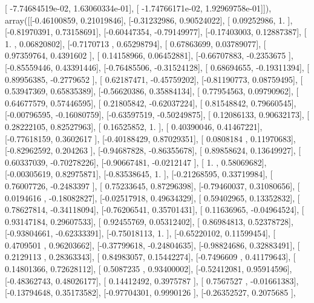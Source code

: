 \documentclass{article}
\begin{document}
       [ -7.74684519e-02,   1.63060334e-01],
       [ -1.74766171e-02,   1.92969758e-01]]), array([[-0.46100859,  0.21019846],
       [-0.31232986,  0.90524022],
       [ 0.09252986,  1.        ],
       [-0.81970391,  0.73158691],
       [-0.60447354, -0.79149977],
       [-0.17403003,  0.12887387],
       [ 1.        ,  0.06820802],
       [-0.7170713 ,  0.65298794],
       [ 0.67863699,  0.03789077],
       [ 0.97359764,  0.4391602 ],
       [ 0.14158966,  0.06452881],
       [-0.66707883, -0.2353675 ],
       [-0.85559446,  0.43391446],
       [-0.76485506, -0.31524128],
       [ 0.68694655, -0.19311394],
       [ 0.89956385, -0.2779652 ],
       [ 0.62187471, -0.45759202],
       [-0.81190773,  0.08759495],
       [ 0.53947369,  0.65835389],
       [-0.56620386,  0.35884134],
       [ 0.77954563,  0.09790962],
       [ 0.64677579,  0.57446595],
       [ 0.21805842, -0.62037224],
       [ 0.81548842,  0.79660545],
       [-0.00796595, -0.16080759],
       [-0.63597519, -0.50249875],
       [ 0.12086133,  0.90632173],
       [ 0.28222105,  0.82527963],
       [ 0.16525852,  1.        ],
       [ 0.40390046,  0.41467221],
       [-0.77618159,  0.3602617 ],
       [-0.40188429,  0.87029351],
       [ 0.0808184 ,  0.11970683],
       [-0.82962592,  0.204263  ],
       [-0.94687828, -0.86355678],
       [ 0.89858624,  0.13649927],
       [ 0.60337039, -0.70278226],
       [-0.90667481, -0.0212147 ],
       [ 1.        ,  0.58069682],
       [-0.00305619,  0.82975871],
       [-0.83538645,  1.        ],
       [-0.21268595,  0.33719984],
       [ 0.76007726, -0.2483397 ],
       [ 0.75233645,  0.87296398],
       [-0.79460037,  0.31080656],
       [ 0.0194616 , -0.18082827],
       [-0.02517918,  0.49634329],
       [ 0.59402965,  0.13352832],
       [ 0.78627814, -0.34118094],
       [-0.76206541,  0.35701431],
       [ 0.11636965, -0.04964524],
       [ 0.93147184,  0.29607533],
       [ 0.92455769,  0.05312402],
       [ 0.86984813,  0.52378728],
       [-0.93804661, -0.62333391],
       [-0.75018113,  1.        ],
       [-0.65220102,  0.11599454],
       [ 0.4709501 ,  0.96203662],
       [-0.37799618, -0.24804635],
       [-0.98824686,  0.32883491],
       [ 0.2129113 ,  0.28363343],
       [ 0.84983057,  0.15442274],
       [-0.7496609 ,  0.41179643],
       [ 0.14801366,  0.72628112],
       [ 0.5087235 ,  0.93400002],
       [-0.52412081,  0.95914596],
       [-0.48362743,  0.48026177],
       [ 0.14412492,  0.3975787 ],
       [ 0.7567527 , -0.01661383],
       [-0.13794648,  0.35173582],
       [-0.97704301,  0.9990126 ],
       [-0.26352527,  0.2075685 ],
\end{document}
